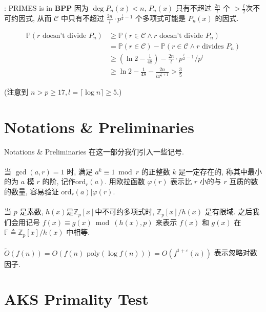 \documentclass{beamer}
\def\P#1{\mathbb{P}\left({#1}\right)}
\def\ge{\geqslant}
\def\ord{\textrm{ord}}
\begin{document}
\begin{frame}{\cite{AB99}: \textsf{PRIMES} is in \textbf{BPP}}
	因为 $\deg P_n(x) < n$,  $P_n(x)$ 只有不超过 $\frac{2n}{l}$ 个 $>\frac{l}{2}$次不可约因式, 从而 $\mathcal C$ 中只有不超过 $\frac{2n}{l} \cdot p^{\frac l2 - 1}$ 个多项式可能是 $P_n(x)$ 的因式.

	\begin{align*}
		\P{r \textrm{ doesn't divide } P_n} &\ge \P{r \in \mathcal C \wedge r \textrm{ doesn't divide } P_n}\\
		&= \P{r \in \mathcal C} - \P{r \in \mathcal C \wedge r \textrm{ divides } P_n}\\
		&\ge \left(\ln 2 - \frac{1}{48}\right) - \frac{2n}{l} \cdot p^{\frac l2 - 1} / p^l\\
		& \ge \ln 2 - \frac{1}{48} - \frac{2n}{l4^{\frac l2 + 1}} > \frac 35
	\end{align*}

	(注意到 $n > p \ge 17, l = \lceil \log n \rceil \ge 5$.)
\end{frame}

\section{Notations \& Preliminaries}
\begin{frame}{Notations \& Preliminaries}
	在这一部分我们引入一些记号.\\~\\

	当 $\gcd(a, r) = 1$ 时, 满足 $a^k \equiv 1 \bmod r$ 的正整数 $k$ 是一定存在的, 称其中最小的为 $a$ 模 $r$ 的阶, 记作$\ord_{r}(a)$. 用欧拉函数 $\varphi(r)$ 表示比 $r$ 小的与 $r$ 互质的数的数量, 容易验证 $\ord_r(a) | \varphi(r)$.\\~\\

	当 $p$ 是素数, $h(x)$是$\mathbb Z_p[x]$中不可约多项式时, $\mathbb Z_p[x] / h(x)$ 是有限域. 之后我们会用记号 $f(x) \equiv g(x) \bmod (h(x), p)$ 来表示 $f(x)$ 和 $g(x)$ 在 $\mathbb F \triangleq \mathbb Z_p[x] / h(x)$ 中相等.\\~\\

	$\tilde O(f(n)) = O(f(n) \textrm{ poly}(\log f(n))) = O(f^{1 + \varepsilon}(n)) $ 表示忽略对数因子.

\end{frame}
\section{AKS Primality Test}
\end{document}
